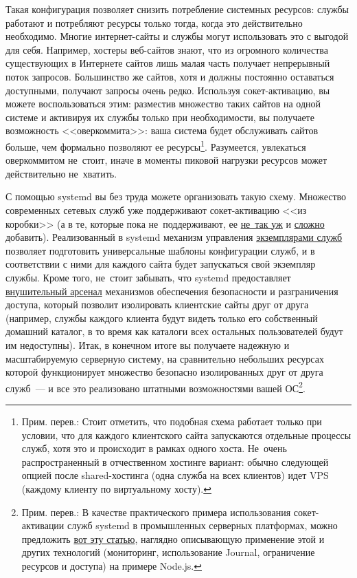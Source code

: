 \documentclass[10pt,oneside,a4paper]{article}
\begin{document}
Такая конфигурация позволяет снизить потребление системных ресурсов: службы
работают и потребляют ресурсы только тогда, когда это действительно необходимо.
Многие интернет-сайты и службы могут использовать это с выгодой для себя.
Например, хостеры веб-сайтов знают, что из огромного количества существующих в
Интернете сайтов лишь малая часть получает непрерывный поток запросов.
Большинство же сайтов, хотя и должны постоянно оставаться доступными, получают
запросы очень редко. Используя сокет-активацию, вы можете воспользоваться этим:
разместив множество таких сайтов на одной системе и активируя их службы только
при необходимости, вы получаете возможность <<оверкоммита>>: ваша система будет
обслуживать сайтов больше, чем формально позволяют ее ресурсы\footnote{Прим.
перев.: Стоит отметить, что подобная схема работает только при условии, что для
каждого клиентского сайта запускаются отдельные процессы служб, хотя это и
происходит в рамках одного хоста. Не~очень распространенный в отчественном
хостинге вариант: обычно следующей опцией после shared-хостинга (одна служба на
всех клиентов) идет VPS (каждому клиенту по виртуальному хосту).}. Разумеется,
увлекаться оверкоммитом не~стоит, иначе в моменты пиковой нагрузки ресурсов
может действительно не~хватить.

С помощью systemd вы без труда можете организовать такую схему. Множество
современных сетевых служб уже поддерживают сокет-активацию <<из коробки>> (а в
те, которые пока не~поддерживают, ее
\href{http://0pointer.de/blog/projects/socket-activation.html}{не~так уж} и
\href{http://0pointer.de/blog/projects/socket-activation2.html}{сложно}
добавить). Реализованный в systemd механизм управления
\hyperref[sec:instances]{экземплярами служб} позволяет  подготовить
универсальные шаблоны конфигурации служб, и в соответствии с ними для каждого
сайта будет запускаться свой экземпляр службы. Кроме того, не~стоит забывать,
что systemd предоставляет \hyperref[sec:security]{внушительный арсенал}
механизмов обеспечения безопасности и разграничения доступа, который позволит
изолировать клиентские сайты друг от друга (например, службы каждого клиента
будут видеть только его собственный домашний каталог, в то время как каталоги
всех остальных пользователей будут им недоступны). Итак, в конечном итоге вы
получаете надежную и масштабируемую серверную систему, на сравнительно небольших
ресурсах которой функционирует множество безопасно изолированных друг от друга
служб~--- и все это реализовано штатными возможностями вашей ОС\footnote{Прим.
перев.: В качестве практического примера использования сокет-активации служб
systemd в промышленных серверных платформах, можно предложить
\href{http://savanne.be/articles/deploying-node-js-with-systemd/}{вот эту
статью}, наглядно описывающую применение этой и других технологий (мониторинг,
использование Journal, ограничение ресурсов и доступа) на примере Node.js.}.
\end{document}
